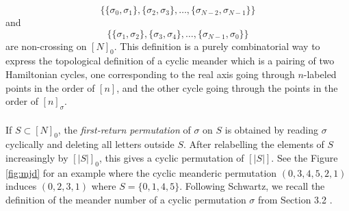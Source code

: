 \documentclass[11pt,a4paper]{amsart}
\theoremstyle{definition}
\theoremstyle{remark}
\begin{document}
\begin{equation*}
        \bigl\{\{\sigma_0,\sigma_1\},\{\sigma_2,\sigma_3\},\ldots,
        \{\sigma_{N-2},\sigma_{N-1}\}\bigr\}
\end{equation*}
and
\begin{equation*}
        \bigl\{\{\sigma_1,\sigma_2\},\{\sigma_3,\sigma_4\},\ldots,
        \{\sigma_{N-1},\sigma_0\}\bigr\}
\end{equation*}
are non-crossing on $[N]_{0}$.  This definition is a purely combinatorial way to express the topological definition of a cyclic meander which is a pairing of two Hamiltonian cycles, one corresponding to the real axis going through $n$-labeled points in the order of $[n]$, and the other cycle going through the points in the order of $[n]_{\sigma}$.    
\\
\\
If $S\subset [N]_{0}$, the \emph{first-return permutation} of $\sigma$ on $S$ is obtained by reading $\sigma$ cyclically and deleting all letters outside $S$.  After relabelling the elements of $S$ increasingly by $[|S|]_{0}$, this gives a cyclic permutation of $[|S|]$. See the Figure \ref{fig:mjd} for an example where the cyclic meanderic permutation $(0,3,4,5,2,1)$ induces $(0,2,3,1)$ where $S = \{0,1,4,5\}$.  Following Schwartz, we recall the definition of the meander number of a cyclic permutation $\sigma$ from Section 3.2 \cite{richtpss}.  
\end{document}
